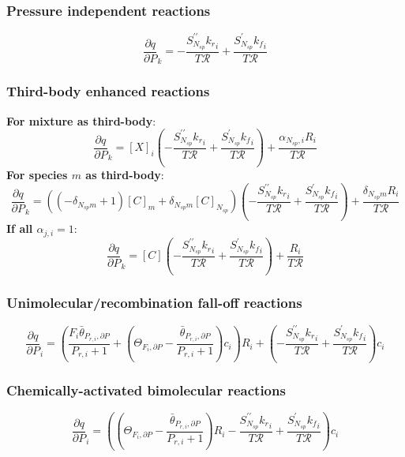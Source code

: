 \documentclass[a4paper,10pt]{article}
\newcommand{\ns}{N_{sp}}
\newcommand{\Ru}{\mathcal{R}}
\begin{document}
\subsubsection{Pressure independent reactions}
\begin{dmath} \frac{\partial q }{\partial P }_{k} = - \frac{S^{\prime\prime}_{\ns} {k_r}_{i}}{T \Ru} + \frac{S^{\prime}_{\ns} {k_f}_{i}}{T \Ru}\end{dmath} 
\subsubsection{Third-body enhanced reactions}
\textbf{For mixture as third-body}:
\begin{dmath} \frac{\partial q }{\partial P }_{k} = [X]_{i} \left(- \frac{S^{\prime\prime}_{\ns} {k_r}_{i}}{T \Ru} + \frac{S^{\prime}_{\ns} {k_f}_{i}}{T \Ru}\right) + \frac{\alpha_{\ns,i} R_{i}}{T \Ru}\end{dmath} 
\textbf{For species $m$ as third-body}:
\begin{dmath} \frac{\partial q }{\partial P }_{k} = \left(\left(- \delta_{\ns m} + 1\right) [C]_{m} + \delta_{\ns m} [C]_{\ns}\right) \left(- \frac{S^{\prime\prime}_{\ns} {k_r}_{i}}{T \Ru} + \frac{S^{\prime}_{\ns} {k_f}_{i}}{T \Ru}\right) + \frac{\delta_{\ns m} R_{i}}{T \Ru}\end{dmath} 
\textbf{If all $\alpha_{j,i} = 1$}:
\begin{dmath} \frac{\partial q }{\partial P }_{k} = [C] \left(- \frac{S^{\prime\prime}_{\ns} {k_r}_{i}}{T \Ru} + \frac{S^{\prime}_{\ns} {k_f}_{i}}{T \Ru}\right) + \frac{R_{i}}{T \Ru}\end{dmath} 
\subsubsection{Unimolecular/recombination fall-off reactions}
\begin{dmath} \frac{\partial q }{\partial P }_{i} = \left(\frac{F_{i} \bar{\theta}_{P_{r, i}, \partial P}}{P_{r, i} + 1} + \left(\Theta_{F_i, \partial P} - \frac{\bar{\theta}_{P_{r, i}, \partial P}}{P_{r, i} + 1}\right) c_{i}\right) R_{i} + \left(- \frac{S^{\prime\prime}_{\ns} {k_r}_{i}}{T \Ru} + \frac{S^{\prime}_{\ns} {k_f}_{i}}{T \Ru}\right) c_{i}\end{dmath} 
\subsubsection{Chemically-activated bimolecular reactions}
\begin{dmath} \frac{\partial q }{\partial P }_{i} = \left(\left(\Theta_{F_i, \partial P} - \frac{\bar{\theta}_{P_{r, i}, \partial P}}{P_{r, i} + 1}\right) R_{i} - \frac{S^{\prime\prime}_{\ns} {k_r}_{i}}{T \Ru} + \frac{S^{\prime}_{\ns} {k_f}_{i}}{T \Ru}\right) c_{i}\end{dmath} 
\end{document}
